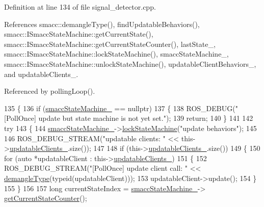 Definition at line 134 of file signal\+\_\+detector.\+cpp.



References smacc\+::demangle\+Type(), find\+Updatable\+Behaviors(), smacc\+::\+I\+Smacc\+State\+Machine\+::get\+Current\+State(), smacc\+::\+I\+Smacc\+State\+Machine\+::get\+Current\+State\+Counter(), last\+State\+\_\+, smacc\+::\+I\+Smacc\+State\+Machine\+::lock\+State\+Machine(), smacc\+State\+Machine\+\_\+, smacc\+::\+I\+Smacc\+State\+Machine\+::unlock\+State\+Machine(), updatable\+Client\+Behaviors\+\_\+, and updatable\+Clients\+\_\+.



Referenced by polling\+Loop().


\begin{DoxyCode}
135 \{
136     \textcolor{keywordflow}{if} (\hyperlink{classsmacc_1_1SignalDetector_a46025de6ac7b5980e22144f9703236a4}{smaccStateMachine\_} == \textcolor{keyword}{nullptr})
137     \{
138         ROS\_DEBUG(\textcolor{stringliteral}{"[PollOnce] update but state machine is not yet set."});
139         \textcolor{keywordflow}{return};
140     \}
141 
142     \textcolor{keywordflow}{try}
143     \{
144         \hyperlink{classsmacc_1_1SignalDetector_a46025de6ac7b5980e22144f9703236a4}{smaccStateMachine\_}->\hyperlink{classsmacc_1_1ISmaccStateMachine_a5c8d4c9a4b11c7950266a00e48080ce3}{lockStateMachine}(\textcolor{stringliteral}{"update behaviors"});
145 
146         ROS\_DEBUG\_STREAM(\textcolor{stringliteral}{"updatable clients: "} << this->\hyperlink{classsmacc_1_1SignalDetector_a36a702afabbc335cbdb1e8699b669323}{updatableClients\_}.size());
147 
148         \textcolor{keywordflow}{if} (this->\hyperlink{classsmacc_1_1SignalDetector_a36a702afabbc335cbdb1e8699b669323}{updatableClients\_}.size())
149         \{
150             \textcolor{keywordflow}{for} (\textcolor{keyword}{auto} *updatableClient : this->\hyperlink{classsmacc_1_1SignalDetector_a36a702afabbc335cbdb1e8699b669323}{updatableClients\_})
151             \{
152                 ROS\_DEBUG\_STREAM(\textcolor{stringliteral}{"[PollOnce] update client call:  "} << 
      \hyperlink{namespacesmacc_a792e7a3ea0843e87543a465b446ae730}{demangleType}(\textcolor{keyword}{typeid}(updatableClient)));
153                 updatableClient->update();
154             \}
155         \}
156 
157         \textcolor{keywordtype}{long} currentStateIndex = \hyperlink{classsmacc_1_1SignalDetector_a46025de6ac7b5980e22144f9703236a4}{smaccStateMachine\_}->
      \hyperlink{classsmacc_1_1ISmaccStateMachine_a03966e531cefc1e096bffa46111871d2}{getCurrentStateCounter}();

\end{DoxyCode}

